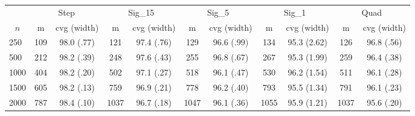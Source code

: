 \begin{tabular}{lcccccccccc}
   \toprule
 
           & \multicolumn{2}{c}{Step}& \multicolumn{2}{c}{Sig\_15}& \multicolumn{2}{c}{Sig\_5}& \multicolumn{2}{c}{Sig\_1}& \multicolumn{2}{c}{Quad} \\ 
             \cmidrule(l{2pt}r{2pt}){2-3} \cmidrule(l{2pt}r{2pt}){4-5} \cmidrule(l{2pt}r{2pt}){6-7} \cmidrule(l{2pt}r{2pt}){8-9}  \cmidrule(l{2pt}r{2pt}){10-11} 
             \multicolumn{1}{c}{$n$} & \multicolumn{1}{c}{m}& \multicolumn{1}{c}{cvg (width)}& \multicolumn{1}{c}{m}& \multicolumn{1}{c}{cvg (width)}& \multicolumn{1}{c}{m}& \multicolumn{1}{c}{cvg (width)}& \multicolumn{1}{c}{m}& \multicolumn{1}{c}{cvg (width)}& \multicolumn{1}{c}{m}& \multicolumn{1}{c}{cvg (width)} \\ \midrule 
        250 & 109 & 98.0 (.77) & 121 & 97.4 (.76) & 129 & 96.6 (.99) & 134 & 95.3 (2.62) & 126 & 96.8 (.56) \\ 
  500 & 212 & 98.2 (.39) & 248 & 97.6 (.43) & 255 & 96.8 (.67) & 267 & 95.3 (1.99) & 259 & 96.4 (.38) \\ 
  1000 & 404 & 98.2 (.20) & 502 & 97.1 (.27) & 518 & 96.1 (.47) & 530 & 96.2 (1.54) & 511 & 96.1 (.28) \\ 
  1500 & 605 & 98.2 (.13) & 759 & 96.9 (.21) & 778 & 96.2 (.40) & 793 & 95.5 (1.34) & 791 & 96.1 (.23) \\ 
  2000 & 787 & 98.4 (.10) & 1037 & 96.7 (.18) & 1047 & 96.1 (.36) & 1055 & 95.9 (1.21) & 1037 & 95.6 (.20) \\ 
   \hline
\end{tabular}
